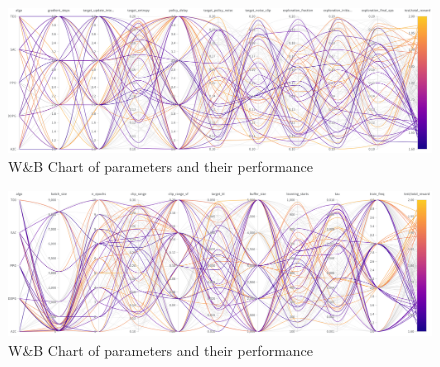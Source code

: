 \documentclass[../xlapes02]{subfiles}
\begin{document}
    \begin{figure}[H]
        \centering
        \includegraphics[width=\linewidth]{image/wandb/wb2}
        \caption{W\&B Chart of parameters and their performance}
        \label{fig:wb-chart2}
    \end{figure}

    \begin{figure}[H]
        \centering
        \includegraphics[width=\linewidth]{image/wandb/wb3}
        \caption{W\&B Chart of parameters and their performance}
        \label{fig:wb-chart3}
    \end{figure}
\end{document}
